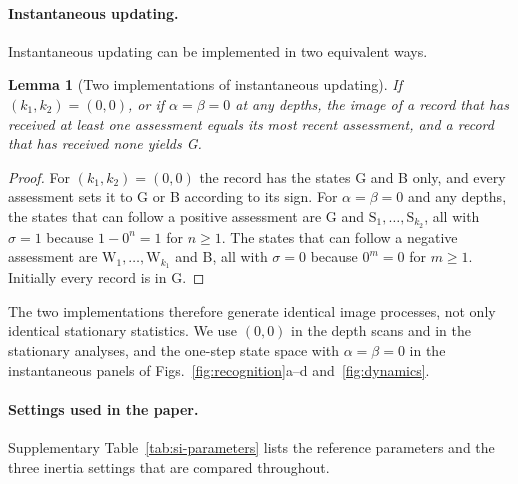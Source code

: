 \documentclass[10pt]{wlscirep}
\newcommand{\st}[1]{\mathrm{#1}}           %
\theoremstyle{plain}
\newtheorem{lemma}{Lemma}
\theoremstyle{remark}
\begin{document}
\paragraph{Instantaneous updating.} Instantaneous updating can be implemented in two equivalent ways.

\begin{lemma}[Two implementations of instantaneous updating]\label{lem:instantaneous}
If $(k_1,k_2)=(0,0)$, or if $\alpha=\beta=0$ at any depths, the image of a record that has received at least one assessment equals its most recent assessment, and a record that has received none yields G.
\end{lemma}
\begin{proof}
For $(k_1,k_2)=(0,0)$ the record has the states G and B only, and every assessment sets it to G or B according to its sign. For $\alpha=\beta=0$ and any depths, the states that can follow a positive assessment are G and $\st S_1,\ldots,\st S_{k_2}$, all with $\sigma=1$ because $1-0^n=1$ for $n\geq1$. The states that can follow a negative assessment are $\st W_1,\ldots,\st W_{k_1}$ and B, all with $\sigma=0$ because $0^m=0$ for $m\geq1$. Initially every record is in G.
\end{proof}

The two implementations therefore generate identical image processes, not only identical stationary statistics. We use $(0,0)$ in the depth scans and in the stationary analyses, and the one-step state space with $\alpha=\beta=0$ in the instantaneous panels of Figs.~\ref{fig:recognition}a--d and~\ref{fig:dynamics}.

\paragraph{Settings used in the paper.} Supplementary Table~\ref{tab:si-parameters} lists the reference parameters and the three inertia settings that are compared throughout.
\end{document}
